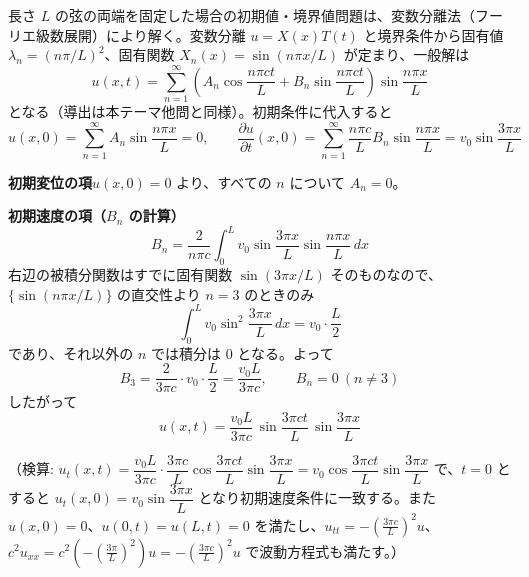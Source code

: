 
長さ $L$ の弦の両端を固定した場合の初期値・境界値問題は、変数分離法（フーリエ級数展開）により解く。変数分離 $u=X(x)T(t)$ と境界条件から固有値 $\lambda_n=(n\pi/L)^2$、固有関数 $X_n(x)=\sin(n\pi x/L)$ が定まり、一般解は
\[
u(x,t) = \sum_{n=1}^{\infty}\left(A_{n}\cos\frac{n\pi c t}{L} + B_{n}\sin\frac{n\pi c t}{L}\right)\sin\frac{n\pi x}{L}
\]
となる（導出は本テーマ他問と同様）。初期条件に代入すると
\[
u(x,0) = \sum_{n=1}^{\infty} A_{n}\sin\frac{n\pi x}{L} = 0, \qquad
\frac{\partial u}{\partial t}(x,0) = \sum_{n=1}^{\infty} \frac{n\pi c}{L}B_{n}\sin\frac{n\pi x}{L} = v_{0}\sin\frac{3\pi x}{L}
\]

\medskip
\noindent
\textbf{初期変位の項}\quad $u(x,0)=0$ より、すべての $n$ について $A_{n}=0$。

\medskip
\noindent
\textbf{初期速度の項（$B_n$ の計算）}\quad
\[
B_{n} = \frac{2}{n\pi c}\int_{0}^{L} v_{0}\sin\frac{3\pi x}{L}\sin\frac{n\pi x}{L}\,dx
\]
右辺の被積分関数はすでに固有関数 $\sin(3\pi x/L)$ そのものなので、$\{\sin(n\pi x/L)\}$ の直交性より $n=3$ のときのみ
\[
\int_{0}^{L} v_{0}\sin^{2}\frac{3\pi x}{L}\,dx = v_{0}\cdot\frac{L}{2}
\]
であり、それ以外の $n$ では積分は $0$ となる。よって
\[
B_{3} = \frac{2}{3\pi c}\cdot v_{0}\cdot\frac{L}{2} = \frac{v_{0}L}{3\pi c}, \qquad B_{n} = 0\ (n \neq 3)
\]
したがって
\[
\boxed{\; u(x,t) = \frac{v_{0}L}{3\pi c}\,\sin\frac{3\pi c t}{L}\,\sin\frac{3\pi x}{L} \;}
\]

（検算: $u_{t}(x,t) = \dfrac{v_{0}L}{3\pi c}\cdot\dfrac{3\pi c}{L}\cos\dfrac{3\pi ct}{L}\sin\dfrac{3\pi x}{L} = v_{0}\cos\dfrac{3\pi ct}{L}\sin\dfrac{3\pi x}{L}$ で、$t=0$ とすると $u_{t}(x,0) = v_{0}\sin\dfrac{3\pi x}{L}$ となり初期速度条件に一致する。また $u(x,0)=0$、$u(0,t)=u(L,t)=0$ を満たし、$u_{tt} = -\left(\frac{3\pi c}{L}\right)^2 u$、$c^2 u_{xx} = c^2\left(-\left(\frac{3\pi}{L}\right)^2\right)u = -\left(\frac{3\pi c}{L}\right)^2 u$ で波動方程式も満たす。）
